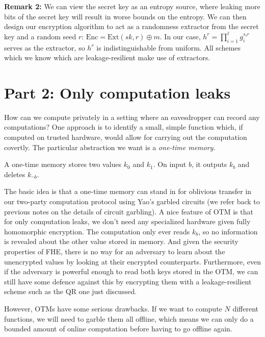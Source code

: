 \documentclass[10pt]{article}
\begin{document}
\textbf{Remark 2:} We can view the secret key as an entropy source, where leaking more bits of the secret key will result in worse bounds on the entropy. We can then design our encryption algorithm to act as a randomness extractor from the secret key and a random seed $r$: $\mathrm{Enc} = \mathrm{Ext}(sk,r) \oplus m$. In our case, $h^r = \prod_{i=1}^\ell g_i^{s_i r}$ serves as the extractor, so $h^r$ is indistinguishable from uniform. All schemes which we know which are leakage-resilient make
use of extractors.

\section{Part 2: Only computation leaks}

How can we compute privately in a setting where an eavesdropper can record any computations? One approach is to identify a small, simple function which, if computed on trusted hardware, would allow for carrying out the computation covertly. The particular abstraction we want is a \emph{one-time memory}.

\begin{definition}
A one-time memory stores two values $k_0$ and $k_1$. On input $b$, it outputs $k_b$ and deletes $k_{\neg b}$.
\end{definition}

The basic idea is that a one-time memory can stand in for oblivious transfer in our two-party computation protocol using Yao's garbled circuits (we refer back to previous notes on the details of circuit garbling). A nice feature of OTM is that for only computation leaks, we don't need any specialized hardware given fully homomorphic encryption. The computation only ever reads $k_b$, so no information is revealed about the other value stored in memory. And given the security properties of
FHE, there is no way for an adversary to learn about the unencrypted values by looking at their encrypted counterparts. Furthermore, even if the adversary is powerful enough to read both keys stored in the OTM, we can still have some defence against this by encrypting them with a leakage-resilient scheme such as the QR one just discussed.

However, OTMs have some serious drawbacks. If we want to compute $N$ different functions, we will need to garble them all offline, which means we can only do a bounded amount of online computation before having to go offline again.


\nocite{*}


\end{document}
